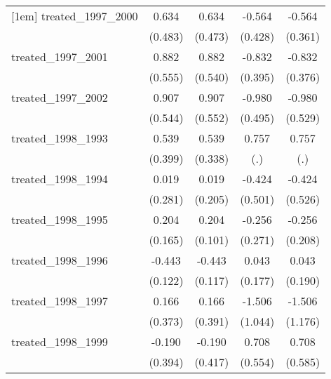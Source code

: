 {\begin{tabular}{l*{4}{c}}
[1em]
treated\_1997\_2000&       0.634         &       0.634         &      -0.564         &      -0.564         \\
            &     (0.483)         &     (0.473)         &     (0.428)         &     (0.361)         \\
[1em]
treated\_1997\_2001&       0.882         &       0.882         &      -0.832\sym{*}  &      -0.832\sym{*}  \\
            &     (0.555)         &     (0.540)         &     (0.395)         &     (0.376)         \\
[1em]
treated\_1997\_2002&       0.907         &       0.907         &      -0.980\sym{*}  &      -0.980         \\
            &     (0.544)         &     (0.552)         &     (0.495)         &     (0.529)         \\
[1em]
treated\_1998\_1993&       0.539         &       0.539         &       0.757         &       0.757         \\
            &     (0.399)         &     (0.338)         &         (.)         &         (.)         \\
[1em]
treated\_1998\_1994&       0.019         &       0.019         &      -0.424         &      -0.424         \\
            &     (0.281)         &     (0.205)         &     (0.501)         &     (0.526)         \\
[1em]
treated\_1998\_1995&       0.204         &       0.204\sym{*}  &      -0.256         &      -0.256         \\
            &     (0.165)         &     (0.101)         &     (0.271)         &     (0.208)         \\
[1em]
treated\_1998\_1996&      -0.443\sym{***}&      -0.443\sym{***}&       0.043         &       0.043         \\
            &     (0.122)         &     (0.117)         &     (0.177)         &     (0.190)         \\
[1em]
treated\_1998\_1997&       0.166         &       0.166         &      -1.506         &      -1.506         \\
            &     (0.373)         &     (0.391)         &     (1.044)         &     (1.176)         \\
[1em]
treated\_1998\_1999&      -0.190         &      -0.190         &       0.708         &       0.708         \\
            &     (0.394)         &     (0.417)         &     (0.554)         &     (0.585)         \\

\end{tabular}}

